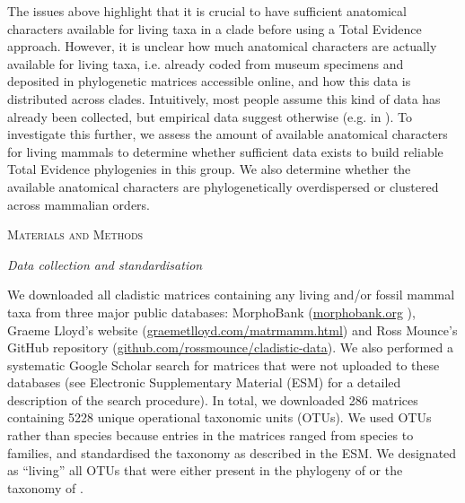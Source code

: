 \documentclass[12pt,letterpaper]{article}
\renewcommand{\section}[1]{%
\bigskip
\begin{center}
\begin{Large}
\normalfont\scshape #1
\medskip
\end{Large}
\end{center}}
\renewcommand{\subsection}[1]{%
\bigskip
\begin{center}
\begin{large}
\normalfont\itshape #1
\end{large}
\end{center}}
\begin{document}
The issues above highlight that it is crucial to have sufficient anatomical characters available for living taxa in a clade before using a Total Evidence approach.
However, it is unclear how much anatomical characters are actually available for living taxa, i.e. already coded from museum specimens and deposited in phylogenetic matrices accessible online, and how this data is distributed across clades. %
Intuitively, most people assume this kind of data has already been collected, but empirical data suggest otherwise (e.g. in \cite{ronquista2012,slaterphylogenetic2013,beckancient2014}).
To investigate this further, we assess the amount of available anatomical characters for living mammals to determine whether sufficient data exists to build reliable Total Evidence phylogenies in this group.
We also determine whether the available anatomical characters are phylogenetically overdispersed or clustered across mammalian orders.

%
%
\section{Materials and Methods}
\subsection{Data collection and standardisation}
We downloaded all cladistic matrices %
 containing any living and/or fossil mammal taxa from three major public databases: MorphoBank (\url{morphobank.org} \cite{morphobank}), Graeme Lloyd's website (\url{graemetlloyd.com/matrmamm.html}) and Ross Mounce's GitHub repository (\url{github.com/rossmounce/cladistic-data}).
We also performed a systematic Google Scholar search for matrices that were not uploaded to these databases (see Electronic Supplementary Material (ESM) for a detailed description of the search procedure).
In total, we downloaded 286 matrices containing 5228 unique operational taxonomic units (OTUs). 
We used OTUs rather than species because entries in the matrices ranged from species to families, and standardised the taxonomy as described in the ESM. 
We designated as ``living'' all OTUs that were either present in the phylogeny of \cite{BinindaEmonds} or the taxonomy of \cite{wilson2005mammal}.
\end{document}
